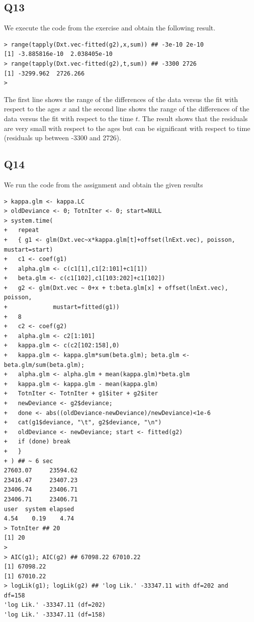 \documentclass[11pt]{article}
\begin{document}
\subsection*{Q13}
We execute the code from the exercise and obtain the following result.

\begin{verbatim}
> range(tapply(Dxt.vec-fitted(g2),x,sum)) ## -3e-10 2e-10
[1] -3.885816e-10  2.038405e-10
> range(tapply(Dxt.vec-fitted(g2),t,sum)) ## -3300 2726
[1] -3299.962  2726.266
>
\end{verbatim}

The first line shows the range of the differences of the data versus the fit with respect to the ages $x$ and the second line shows the range of the differences of the data versus the fit with respect to the time $t$. The result shows that the residuals are very small with respect to the ages but can be significant with respect to time (residuals up between -3300 and 2726).


\subsection*{Q14}
We run the code from the assignment and obtain the given results
\begin{verbatim}
> kappa.glm <- kappa.LC
> oldDeviance <- 0; TotnIter <- 0; start=NULL
> system.time(
+   repeat
+   { g1 <- glm(Dxt.vec~x*kappa.glm[t]+offset(lnExt.vec), poisson, mustart=start)
+   c1 <- coef(g1)
+   alpha.glm <- c(c1[1],c1[2:101]+c1[1])
+   beta.glm <- c(c1[102],c1[103:202]+c1[102])
+   g2 <- glm(Dxt.vec ~ 0+x + t:beta.glm[x] + offset(lnExt.vec), poisson,
+             mustart=fitted(g1))
+   8
+   c2 <- coef(g2)
+   alpha.glm <- c2[1:101]
+   kappa.glm <- c(c2[102:158],0)
+   kappa.glm <- kappa.glm*sum(beta.glm); beta.glm <- beta.glm/sum(beta.glm);
+   alpha.glm <- alpha.glm + mean(kappa.glm)*beta.glm
+   kappa.glm <- kappa.glm - mean(kappa.glm)
+   TotnIter <- TotnIter + g1$iter + g2$iter
+   newDeviance <- g2$deviance;
+   done <- abs((oldDeviance-newDeviance)/newDeviance)<1e-6
+   cat(g1$deviance, "\t", g2$deviance, "\n")
+   oldDeviance <- newDeviance; start <- fitted(g2)
+   if (done) break
+   }
+ ) ## ~ 6 sec
27603.07 	 23594.62 
23416.47 	 23407.23 
23406.74 	 23406.71 
23406.71 	 23406.71 
user  system elapsed 
4.54    0.19    4.74 
> TotnIter ## 20
[1] 20
> 
> AIC(g1); AIC(g2) ## 67098.22 67010.22
[1] 67098.22
[1] 67010.22
> logLik(g1); logLik(g2) ## 'log Lik.' -33347.11 with df=202 and df=158
'log Lik.' -33347.11 (df=202)
'log Lik.' -33347.11 (df=158)
\end{verbatim}
\end{document}
